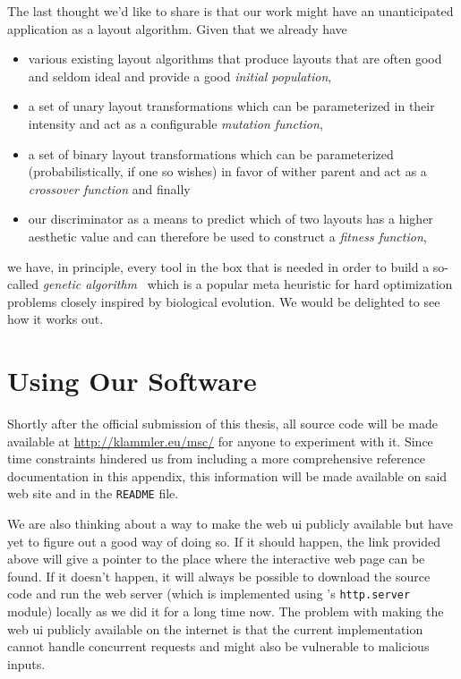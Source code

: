 \documentclass{graphstudy}
\begin{document}
The last thought we'd like to share is that our work might have an unanticipated application as a layout algorithm.
Given that we already have
\begin{itemize}
\item various existing layout algorithms that produce layouts that are often good and seldom ideal and provide a good
  \emph{initial population},
\item a set of unary layout transformations which can be parameterized in their intensity and act as a configurable
  \emph{mutation function},
\item a set of binary layout transformations which can be parameterized (probabilistically, if one so wishes) in favor
  of wither parent and act as a \emph{crossover function} and finally
\item our discriminator as a means to predict which of two layouts has a higher aesthetic value and can therefore be
  used to construct a \emph{fitness function},
\end{itemize}
we have, in principle, every tool in the box that is needed in order to build a so-called \emph{genetic
  algorithm}~\cite{Mitchell1996} which is a popular meta heuristic for hard optimization problems closely inspired by
biological evolution.  We would be delighted to see how it works out.

\backmatter
\renewcommand*{\thesection}{\Alph{section}}
\cleardoublepage

\printbibliography[notkeyword=transient]

\printindex


\section*{Using Our Software}

Shortly after the official submission of this thesis, all source code will be made available at
\url{http://klammler.eu/msc/} for anyone to experiment with it.  Since time constraints hindered us from including a
more comprehensive reference documentation in this appendix, this information will be made available on said web site
and in the \verb`README` file.

We are also thinking about a way to make the web \acs{ui} publicly available but have yet to figure out a good way of
doing so.  If it should happen, the link provided above will give a pointer to the place where the interactive web page
can be found.  If it doesn't happen, it will always be possible to download the source code and run the web server
(which is implemented using \Python's \verb`http.server` module) locally as we did it for a long time now.  The problem
with making the web \acs{ui} publicly available on the internet is that the current implementation cannot handle
concurrent requests and might also be vulnerable to malicious inputs.
\end{document}

